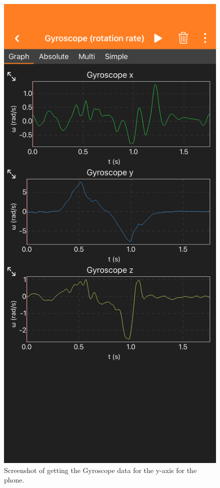 \documentclass[idxtotoc,hyperref,openany]{labbook} %
\begin{document}
\begin{figure}[H] %
\begin{center}
\includegraphics[width=.7\linewidth]{images/Lab.02/GyroscopeY.PNG}
\end{center}
\caption{Screenshot of getting the Gyroscope data for the y-axis for the phone.}
\label{fig:Lab02-GyroscopeY}
\end{figure}
\end{document}
